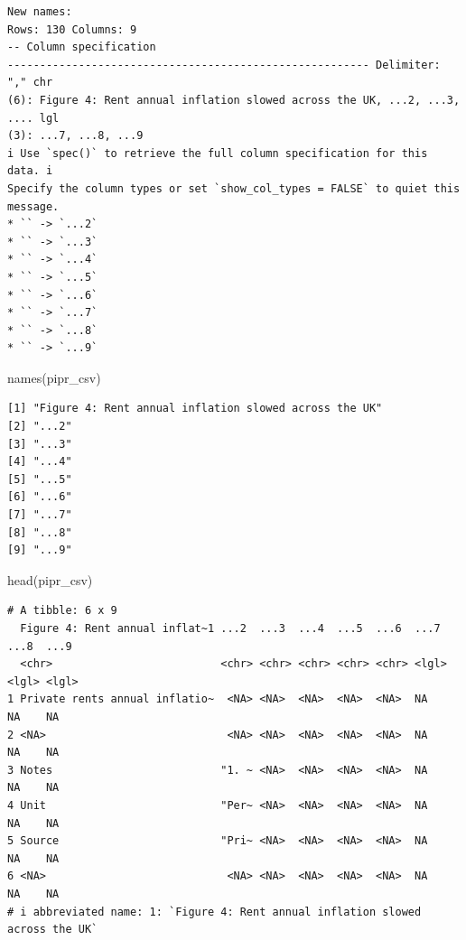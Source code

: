 \documentclass[
  letterpaper,
  DIV=11,
  numbers=noendperiod]{scrreprt}
\newenvironment{Shaded}{\begin{snugshade}}{\end{snugshade}}
\newcommand{\FunctionTok}[1]{\textcolor[rgb]{0.28,0.35,0.67}{#1}}
\newcommand{\NormalTok}[1]{\textcolor[rgb]{0.00,0.23,0.31}{#1}}
\begin{document}
\begin{verbatim}
New names:
Rows: 130 Columns: 9
-- Column specification
-------------------------------------------------------- Delimiter: "," chr
(6): Figure 4: Rent annual inflation slowed across the UK, ...2, ...3, .... lgl
(3): ...7, ...8, ...9
i Use `spec()` to retrieve the full column specification for this data. i
Specify the column types or set `show_col_types = FALSE` to quiet this message.
* `` -> `...2`
* `` -> `...3`
* `` -> `...4`
* `` -> `...5`
* `` -> `...6`
* `` -> `...7`
* `` -> `...8`
* `` -> `...9`
\end{verbatim}

\begin{Shaded}
\begin{Highlighting}[]
\FunctionTok{names}\NormalTok{(pipr\_csv)}
\end{Highlighting}
\end{Shaded}

\begin{verbatim}
[1] "Figure 4: Rent annual inflation slowed across the UK"
[2] "...2"                                                
[3] "...3"                                                
[4] "...4"                                                
[5] "...5"                                                
[6] "...6"                                                
[7] "...7"                                                
[8] "...8"                                                
[9] "...9"                                                
\end{verbatim}

\begin{Shaded}
\begin{Highlighting}[]
\FunctionTok{head}\NormalTok{(pipr\_csv)}
\end{Highlighting}
\end{Shaded}

\begin{verbatim}
# A tibble: 6 x 9
  Figure 4: Rent annual inflat~1 ...2  ...3  ...4  ...5  ...6  ...7  ...8  ...9 
  <chr>                          <chr> <chr> <chr> <chr> <chr> <lgl> <lgl> <lgl>
1 Private rents annual inflatio~  <NA> <NA>  <NA>  <NA>  <NA>  NA    NA    NA   
2 <NA>                            <NA> <NA>  <NA>  <NA>  <NA>  NA    NA    NA   
3 Notes                          "1. ~ <NA>  <NA>  <NA>  <NA>  NA    NA    NA   
4 Unit                           "Per~ <NA>  <NA>  <NA>  <NA>  NA    NA    NA   
5 Source                         "Pri~ <NA>  <NA>  <NA>  <NA>  NA    NA    NA   
6 <NA>                            <NA> <NA>  <NA>  <NA>  <NA>  NA    NA    NA   
# i abbreviated name: 1: `Figure 4: Rent annual inflation slowed across the UK`
\end{verbatim}
\end{document}
